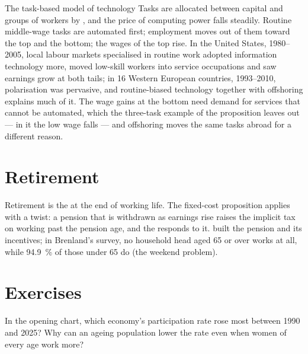 \begin{model}{The task-based model of technology}
\assumes Tasks are allocated between capital and groups of workers by , and the price of computing power falls steadily.
\predicts Routine middle-wage tasks are automated first; employment moves out of
them toward the top and the bottom; the wages of the top rise.
\tested In the United States, 1980--2005, local labour markets specialised in routine
work adopted information technology more, moved low-skill workers into service
occupations and saw earnings grow at both tails; %
in 16 Western European countries, 1993--2010, polarisation was pervasive, and
routine-biased technology together with offshoring explains much of it. %
\breaks The wage gains at the bottom need demand for services that cannot be
automated, which the three-task example of the proposition leaves out --- in it the
low wage falls --- and offshoring moves the same tasks abroad for a different reason.
\end{model}

\section{Retirement}\label{sec:b3:labour-supply-and-demand:retirement}

Retirement is the  at the end of working life. The fixed-cost
proposition applies with a twist: a pension that is withdrawn as earnings rise
raises the implicit tax on working past the pension age, and the 
responds to it.  built the pension and its incentives;
in Brenland's survey, no household head aged 65 or over works at all, while 94.9~\% of
those under 65 do (the weekend problem). %

\section{Exercises}\label{sec:b3:labour-supply-and-demand:exercises}

\begin{exercise}[$\star$]\label{exo:b3:labour-supply-and-demand:1}
In the opening chart, which economy's participation rate rose most between 1990 and
2025? Why can an ageing population lower the rate even when women of every age
work more?
\end{exercise}

